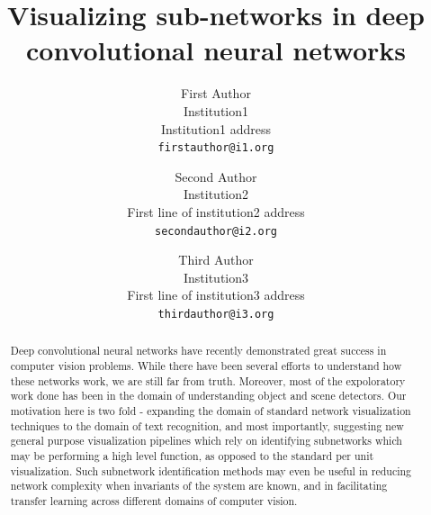 \documentclass[10pt,twocolumn,letterpaper]{article}
\begin{document}
\title{Visualizing sub-networks in deep convolutional neural networks}

\author{First Author\\
Institution1\\
Institution1 address\\
{\tt\small firstauthor@i1.org}
\and
Second Author\\
Institution2\\
First line of institution2 address\\
{\tt\small secondauthor@i2.org}
\and
Third Author\\
Institution3\\
First line of institution3 address\\
{\tt\small thirdauthor@i3.org}
}

\maketitle

\begin{abstract}
   Deep convolutional neural networks have recently demonstrated great success in computer vision problems. While there have been several efforts to understand how these networks work, we are still far from truth. Moreover, most of the expoloratory work done has been in the domain of understanding object and scene detectors. Our motivation here is two fold - expanding the domain of standard network visualization techniques to the domain of text recognition, and most importantly, suggesting new general purpose visualization pipelines which rely on identifying subnetworks which may be performing a high level function, as opposed to the standard per unit visualization. Such subnetwork identification methods may even be useful in reducing network complexity when invariants of the system are known, and in facilitating transfer learning across different domains of computer vision. 
\end{abstract}

\end{document}
